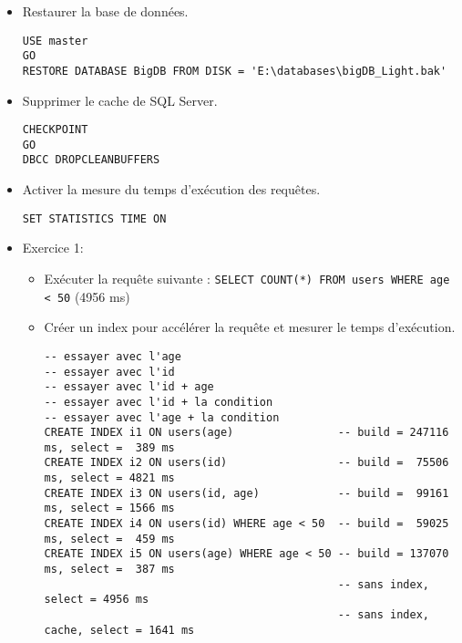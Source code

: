 \documentclass[a4paper]{article}
\begin{document}
\begin{itemize}



\item Restaurer la base de données.
\begin{example} \begin{verbatim}
USE master
GO
RESTORE DATABASE BigDB FROM DISK = 'E:\databases\bigDB_Light.bak'
\end{verbatim} \end{example}



\item Supprimer le cache de SQL Server.
\begin{example} \begin{verbatim}
CHECKPOINT
GO
DBCC DROPCLEANBUFFERS
\end{verbatim} \end{example}



\item Activer la mesure du temps d'exécution des requêtes.
\begin{example} \begin{verbatim}
SET STATISTICS TIME ON
\end{verbatim} \end{example}



\item Exercice 1:
\begin{itemize}
\item Exécuter la requête suivante : \texttt{SELECT COUNT(*) FROM users WHERE age < 50} (4956 ms)
\item Créer un index pour accélérer la requête et mesurer le temps d'exécution.
\begin{example} \begin{verbatim}
-- essayer avec l'age
-- essayer avec l'id
-- essayer avec l'id + age
-- essayer avec l'id + la condition
-- essayer avec l'age + la condition
CREATE INDEX i1 ON users(age)                -- build = 247116 ms, select =  389 ms
CREATE INDEX i2 ON users(id)                 -- build =  75506 ms, select = 4821 ms
CREATE INDEX i3 ON users(id, age)            -- build =  99161 ms, select = 1566 ms
CREATE INDEX i4 ON users(id) WHERE age < 50  -- build =  59025 ms, select =  459 ms
CREATE INDEX i5 ON users(age) WHERE age < 50 -- build = 137070 ms, select =  387 ms
                                             -- sans index,        select = 4956 ms
                                             -- sans index, cache, select = 1641 ms
\end{verbatim} \end{example}
\end{itemize}




\end{itemize}
\end{document}
